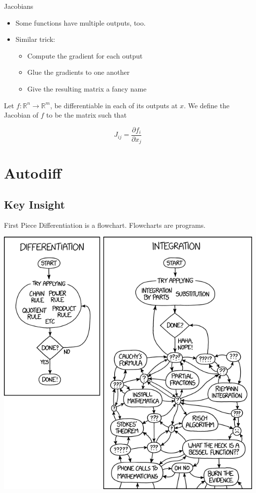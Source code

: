 \documentclass[pdf]{beamer}
\begin{document}
\begin{frame}{Jacobians}
  \begin{itemize}
  \item Some functions have multiple outputs, too.
  \item Similar trick:
    \begin{itemize}
    \item Compute the gradient for each output
    \item Glue the gradients to one another
    \item Give the resulting matrix a fancy name
    \end{itemize}
  \end{itemize}
  \begin{definition}
    Let $f:\mathbb{R}^n\rightarrow\mathbb{R}^m$, be differentiable in each of its outputs at $x$. We define the Jacobian of $f$ to be the matrix such that

    \[ J_{ij} = \frac{\partial f_i}{\partial x_j} \]
  \end{definition}
\end{frame}

\section{Autodiff}
\subsection{Key Insight}
\begin{frame}{First Piece}
  Differentiation is a flowchart. Flowcharts are programs.
  \begin{center}
    \includegraphics[scale=0.25]{xkcd_differentiation_and_integration.png}
  \end{center}
\end{frame}
\end{document}
